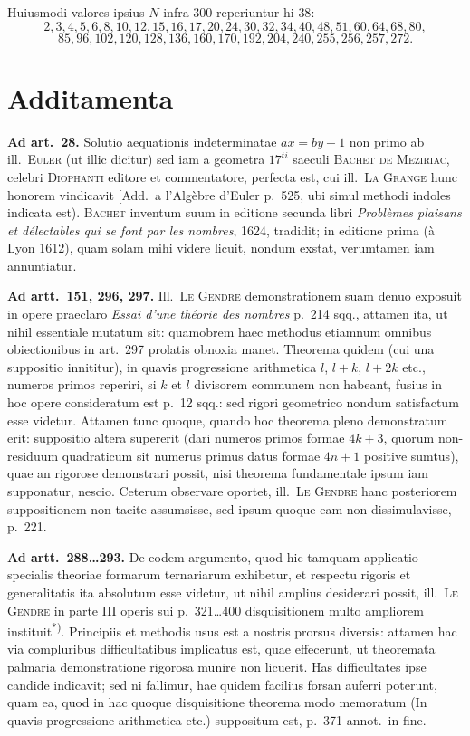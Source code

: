 \documentclass[12pt,a4paper]{article}
\theoremstyle{plain}
\theoremstyle{definition}
\theoremstyle{remark}
\begin{document}
Huiusmodi valores ipsius $N$ infra $300$ reperiuntur hi $38$:
\[2, 3, 4, 5, 6, 8, 10, 12, 15, 16, 17, 20, 24, 30, 32, 34, 40, 48, 51, 60, 64, 68, 80,\]
\[85, 96, 102, 120, 128, 136, 160, 170, 192, 204, 240, 255, 256, 257, 272.\]


\newpage
\section*{Additamenta}

\textbf{Ad art.\ 28.} Solutio aequationis indeterminatae $ax = by + 1$ non primo ab ill.\ \textsc{Euler} (ut illic dicitur) sed iam a geometra $17^{ti}$ saeculi \textsc{Bachet de Meziriac}, celebri \textsc{Diophanti} editore et commentatore, perfecta est, cui ill.\ \textsc{La Grange} hunc honorem vindicavit [Add.\ a l'Alg\`ebre d'Euler p.\ 525, ubi simul methodi indoles indicata est). \textsc{Bachet} inventum suum in editione secunda libri \textit{Probl\`emes plaisans et d\'electables qui se font par les nombres}, 1624, tradidit; in editione prima (\`a Lyon 1612), quam solam mihi videre licuit, nondum exstat, verumtamen iam annuntiatur.

\vspace{0.5em}
\textbf{Ad artt.\ 151, 296, 297.} Ill.\ \textsc{Le Gendre} demonstrationem suam denuo exposuit in opere praeclaro \textit{Essai d'une th\'eorie des nombres} p.\ 214 sqq., attamen ita, ut nihil essentiale mutatum sit: quamobrem haec methodus etiamnum omnibus obiectionibus in art.\ 297 prolatis obnoxia manet. Theorema quidem (cui una suppositio innititur), in quavis progressione arithmetica $l$, $l+k$, $l+2k$ etc., numeros primos reperiri, si $k$ et $l$ divisorem communem non habeant, fusius in hoc opere consideratum est p.\ 12 sqq.: sed rigori geometrico nondum satisfactum esse videtur. Attamen tunc quoque, quando hoc theorema pleno demonstratum erit: suppositio altera supererit (dari numeros primos formae $4k+3$, quorum non-residuum quadraticum sit numerus primus datus formae $4n+1$ positive sumtus), quae an rigorose demonstrari possit, nisi theorema fundamentale ipsum iam supponatur, nescio. Ceterum observare oportet, ill.\ \textsc{Le Gendre} hanc posteriorem suppositionem non tacite assumsisse, sed ipsum quoque eam non dissimulavisse, p.\ 221.

\vspace{0.5em}
\textbf{Ad artt.\ 288\ldots293.} De eodem argumento, quod hic tamquam applicatio specialis theoriae formarum ternariarum exhibetur, et respectu rigoris et generalitatis ita absolutum esse videtur, ut nihil amplius desiderari possit, ill.\ \textsc{Le Gendre} in parte III operis sui p.\ 321\ldots400 disquisitionem multo ampliorem instituit\textsuperscript{*)}. Principiis et methodis usus est a nostris prorsus diversis: attamen hac via compluribus difficultatibus implicatus est, quae effecerunt, ut theoremata palmaria demonstratione rigorosa munire non licuerit. Has difficultates ipse candide indicavit; sed ni fallimur, hae quidem facilius forsan auferri poterunt, quam ea, quod in hac quoque disquisitione theorema modo memoratum (In quavis progressione arithmetica etc.) suppositum est, p.\ 371 annot.\ in fine.
\end{document}
